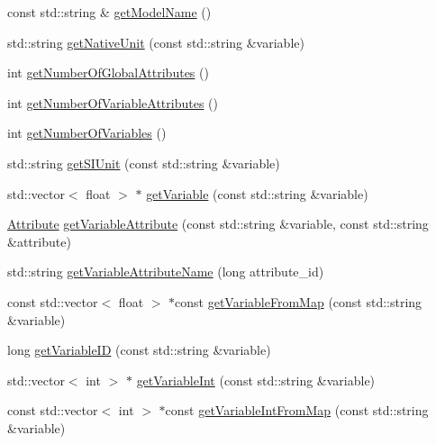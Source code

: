 \begin{DoxyCompactItemize}
\item 
const std\-::string \& \hyperlink{classccmc_1_1_kameleon_aa2d4fbdefe2492bf8132e5e76411e542}{get\-Model\-Name} ()
\item 
std\-::string \hyperlink{classccmc_1_1_kameleon_aca6a8410aa27c662bc24348df24b939b}{get\-Native\-Unit} (const std\-::string \&variable)
\item 
int \hyperlink{classccmc_1_1_kameleon_a4da989eb8f5b56b397d1e5536881cf2c}{get\-Number\-Of\-Global\-Attributes} ()
\item 
int \hyperlink{classccmc_1_1_kameleon_aaecaabf2cdd3370505729dd666e75b3f}{get\-Number\-Of\-Variable\-Attributes} ()
\item 
int \hyperlink{classccmc_1_1_kameleon_abd7d970692583bc3ff4fe09a5ad7266e}{get\-Number\-Of\-Variables} ()
\item 
std\-::string \hyperlink{classccmc_1_1_kameleon_a0002caf4908097deda7cdf5508d63bdc}{get\-S\-I\-Unit} (const std\-::string \&variable)
\item 
std\-::vector$<$ float $>$ $\ast$ \hyperlink{classccmc_1_1_kameleon_ac8ee40843afc1cc04a7b1cd8d51bfed3}{get\-Variable} (const std\-::string \&variable)
\begin{DoxyCompactList}\small\item\em \end{DoxyCompactList}\item 
\hyperlink{classccmc_1_1_attribute}{Attribute} \hyperlink{classccmc_1_1_kameleon_a8791585b0542359be09fe26e5b6488d7}{get\-Variable\-Attribute} (const std\-::string \&variable, const std\-::string \&attribute)
\item 
std\-::string \hyperlink{classccmc_1_1_kameleon_a9057b8600d5fcd9a045c9f87a5fffa6e}{get\-Variable\-Attribute\-Name} (long attribute\-\_\-id)
\item 
const std\-::vector$<$ float $>$ $\ast$const \hyperlink{classccmc_1_1_kameleon_a62c73c04706b7702ea499138dc97c14b}{get\-Variable\-From\-Map} (const std\-::string \&variable)
\item 
long \hyperlink{classccmc_1_1_kameleon_a947844b073cd69416917c9a0356a87d4}{get\-Variable\-I\-D} (const std\-::string \&variable)
\item 
std\-::vector$<$ int $>$ $\ast$ \hyperlink{classccmc_1_1_kameleon_afe1a3bbd2e665a33382c034098610829}{get\-Variable\-Int} (const std\-::string \&variable)
\item 
const std\-::vector$<$ int $>$ $\ast$const \hyperlink{classccmc_1_1_kameleon_a5c24ccd86ff1ffba4331f6a6a2231de4}{get\-Variable\-Int\-From\-Map} (const std\-::string \&variable)

\end{DoxyCompactItemize}
